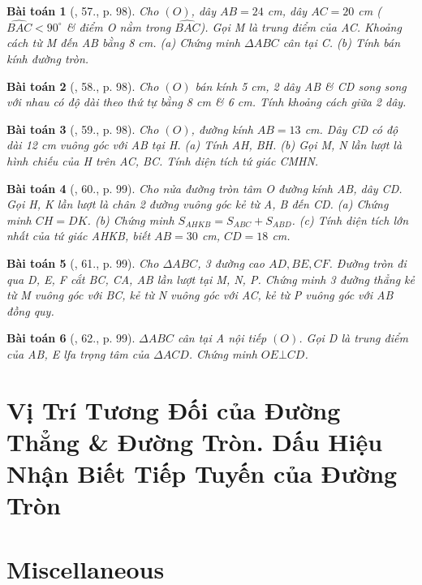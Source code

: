 \documentclass{article}
\newtheorem{baitoan}{Bài toán}
\begin{document}
\begin{baitoan}[\cite{Binh_Toan_9_tap_1}, 57., p. 98]
	Cho $(O)$, dây $AB = 24$ {\rm cm}, dây $AC = 20$ {\rm cm} ($\widehat{BAC} < 90^\circ$ \& điểm O nằm trong $\widehat{BAC}$). Gọi M là trung điểm của AC. Khoảng cách từ M đến AB bằng {\rm8 cm}. (a) Chứng minh $\Delta ABC$ cân tại C. (b) Tính bán kính đường tròn.
\end{baitoan}

\begin{baitoan}[\cite{Binh_Toan_9_tap_1}, 58., p. 98]
	Cho $(O)$ bán kính {\rm5 cm}, 2 dây AB \& CD song song với nhau có độ dài theo thứ tự bằng {\rm8 cm} \& {\rm6 cm}. Tính khoảng cách giữa 2 dây.
\end{baitoan}

\begin{baitoan}[\cite{Binh_Toan_9_tap_1}, 59., p. 98]
	Cho $(O)$, đường kính $AB = 13$ {\rm cm}. Dây CD có độ dài {\rm 12 cm} vuông góc với AB tại H. (a) Tính AH, BH. (b) Gọi M, N lần lượt là hình chiếu của H trên AC, BC. Tính diện tích tứ giác CMHN.
\end{baitoan}

\begin{baitoan}[\cite{Binh_Toan_9_tap_1}, 60., p. 99]
	Cho nửa đường tròn tâm O đường kính AB, dây CD. Gọi H, K lần lượt là chân 2 đường vuông góc kẻ từ A, B đến CD. (a) Chứng minh $CH = DK$. (b) Chứng minh $S_{AHKB} = S_{ABC} + S_{ABD}$. (c) Tính diện tích lớn nhất của tứ giác AHKB, biết $AB = 30$ {\rm cm}, $CD = 18$ {\rm cm}.
\end{baitoan}

\begin{baitoan}[\cite{Binh_Toan_9_tap_1}, 61., p. 99]
	Cho $\Delta ABC$, 3 đường cao $AD,BE,CF$. Đường tròn đi qua D, E, F cắt BC, CA, AB lần lượt tại M, N, P. Chứng minh 3 đường thẳng kẻ từ M vuông góc với BC, kẻ từ N vuông góc với AC, kẻ từ P vuông góc với AB đồng quy.
\end{baitoan}

\begin{baitoan}[\cite{Binh_Toan_9_tap_1}, 62., p. 99]
	$\Delta ABC$ cân tại A nội tiếp $(O)$. Gọi D là trung điểm của AB, E lfa trọng tâm của $\Delta ACD$. Chứng minh $OE\bot CD$.
\end{baitoan}


\section{Vị Trí Tương Đối của Đường Thẳng \& Đường Tròn. Dấu Hiệu Nhận Biết Tiếp Tuyến của Đường Tròn}


\section{Miscellaneous}


\printbibliography[heading=bibintoc]
\end{document}

